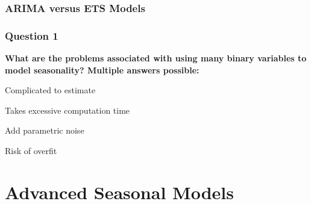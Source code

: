 \documentclass{beamer}
\newenvironment{wideenumerate}{\enumerate\addtolength{\itemsep}{10pt}}{\endenumerate}
\begin{document}
\begin{frame}
  \frametitle{ARIMA versus ETS Models}
\end{frame}



\begin{frame}
  \frametitle{Question 1}

\textbf{What are the problems associated with using many binary variables to model seasonality? Multiple answers possible:}\\
\bigskip
\begin{wideenumerate}
  \item Complicated to estimate
  \item Takes excessive computation time 
  \item Add parametric noise
  \item Risk of overfit
\end{wideenumerate}  
\end{frame}

\section{Advanced Seasonal Models}
\end{document}
